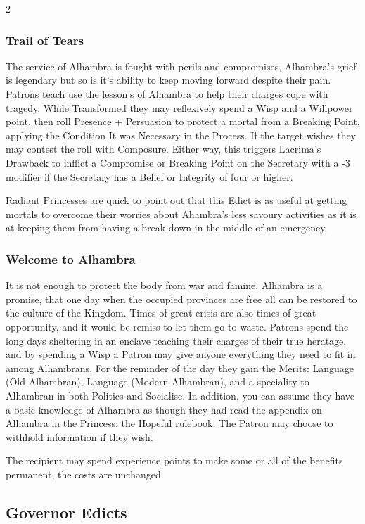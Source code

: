\begin{multicols}{2}
\subsubsection*{Trail of Tears}

The service of Alhambra is fought with perils and compromises, Alhambra's grief is legendary but so is it's ability to keep moving forward despite their pain. Patrons teach use the lesson's of Alhambra to help their charges cope with tragedy. While Transformed they may reflexively spend a Wisp and a Willpower point, then roll Presence + Persuasion to protect a mortal from a Breaking Point, applying the Condition It was Necessary in the Process. If the target wishes they may contest the roll with Composure. Either way, this triggers Lacrima's Drawback to inflict a Compromise or Breaking Point on the Secretary with a -3 modifier if the Secretary has a Belief or Integrity of four or higher.

Radiant Princesses are quick to point out that this Edict is as useful at getting mortals to overcome their worries about Ahambra's less savoury activities as it is at keeping them from having a break down in the middle of an emergency. 

\subsubsection*{Welcome to Alhambra}

It is not enough to protect the body from war and famine. Alhambra is a promise, that one day when the occupied provinces are free all can be restored to the culture of the Kingdom. Times of great crisis are also times of great opportunity, and it would be remiss to let them go to waste. Patrons spend the long days sheltering in an enclave teaching their charges of their true heratage, and by spending a Wisp a Patron may give anyone everything they need to fit in among Alhambrans. For the reminder of the day they gain the Merits: Language (Old Alhambran), Language (Modern Alhambran), and a speciality to Alhambran in both Politics and Socialise. In addition, you can assume they have a basic knowledge of Alhambra as though they had read the appendix on Alhambra in the Princess: the Hopeful rulebook. The Patron may choose to withhold information if they wish.

The recipient may spend experience points to make some or all of the benefits permanent, the costs are unchanged. 

\subsection*{Governor Edicts}


\end{multicols}
